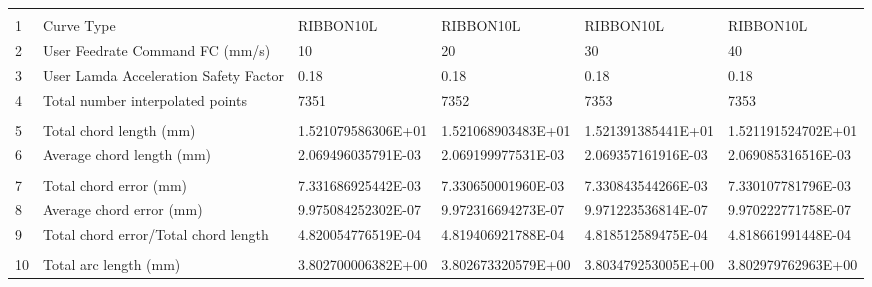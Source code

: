 

\begin{tabular}{ p{0.5cm} p{8.0cm} p{4.00cm} p{4.0cm} p{4.00cm} p{4.0cm}}
\hline
	&                                                      &                    &                      &                    & \\
1	& Curve Type	                                       & RIBBON10L          & RIBBON10L	           & RIBBON10L          &	RIBBON10L \\
2	& User Feedrate Command FC (mm/s)                      &	10	            &    20                &	30	            &    40 \\
3	& User Lamda Acceleration Safety Factor	               &   0.18             &	0.18               &   0.18             &   0.18 \\
4	& Total number interpolated points	                   &   7351	            & 7352                 &	7353            &	7353\\
	&                                                      &                    &                      &                    & \\
5	& Total chord length (mm)	                           & 1.521079586306E+01	& 1.521068903483E+01   & 1.521391385441E+01	& 1.521191524702E+01 \\
6	& Average chord length (mm)	                           & 2.069496035791E-03	& 2.069199977531E-03   & 2.069357161916E-03	& 2.069085316516E-03 \\
	&                                                      &                    &                      &                    & \\
7	& Total chord error (mm)	                           & 7.331686925442E-03	& 7.330650001960E-03   & 7.330843544266E-03	& 7.330107781796E-03 \\
8	& Average chord error (mm)	                           & 9.975084252302E-07	& 9.972316694273E-07   & 9.971223536814E-07	& 9.970222771758E-07 \\
9	& Total chord error/Total chord length                 & 4.820054776519E-04	& 4.819406921788E-04   & 4.818512589475E-04	& 4.818661991448E-04 \\
	&                                                      &                    &                      &                    & \\
10	& Total arc length (mm)	                               & 3.802700006382E+00	& 3.802673320579E+00   & 3.803479253005E+00	& 3.802979762963E+00 \\

\end{tabular}
